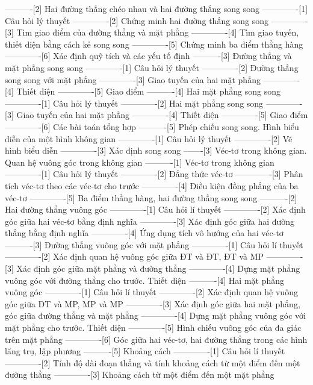 ----------[2] Hai đường thẳng chéo nhau và hai đường thẳng song song
-------------[1] Câu hỏi lý thuyết
-------------[2] Chứng minh hai đường thẳng song song
-------------[3] Tìm giao điểm của đường thẳng và mặt phẳng
-------------[4] Tìm giao tuyến, thiết diện bằng cách kẻ song song
-------------[5] Chứng minh ba điểm thẳng hàng
-------------[6] Xác định quỹ tích và các yếu tố định
----------[3] Đường thẳng và mặt phẳng song song
-------------[1] Câu hỏi lý thuyết
-------------[2] Đường thẳng song song với mặt phẳng
-------------[3] Giao tuyến của hai mặt phẳng
-------------[4] Thiết diện
-------------[5] Giao điểm
----------[4] Hai mặt phẳng song song
-------------[1] Câu hỏi lý thuyết
-------------[2] Hai mặt phẳng song song
-------------[3] Giao tuyến của hai mặt phẳng
-------------[4] Thiết diện
-------------[5] Giao điểm
-------------[6] Các bài toán tổng hợp
----------[5] Phép chiếu song song. Hình biểu diễn của một hình không gian
-------------[1] Câu hỏi lý thuyết
-------------[2] Vẽ hình biểu diễn
-------------[3] Xác định song song
-------[3] Véc-tơ trong không gian. Quan hệ vuông góc trong không gian
----------[1] Véc-tơ trong không gian
-------------[1] Câu hỏi lý thuyết
-------------[2] Đẳng thức véc-tơ
-------------[3] Phân tích véc-tơ theo các véc-tơ cho trước
-------------[4] Điều kiện đồng phẳng của ba véc-tơ
-------------[5] Ba điểm thẳng hàng, hai đường thẳng song song
----------[2] Hai đường thẳng vuông góc
-------------[1] Câu hỏi lí thuyết
-------------[2] Xác định góc giữa hai véc-tơ bằng định nghĩa
-------------[3] Xác định góc giữa hai đường thẳng bằng định nghĩa
-------------[4] Ứng dụng tích vô hướng của hai véc-tơ
----------[3] Đường thẳng vuông góc với mặt phẳng
-------------[1] Câu hỏi lí thuyết
-------------[2] Xác định quan hệ vuông góc giữa ĐT và ĐT, ĐT và MP
-------------[3] Xác định góc giữa mặt phẳng và đường thẳng
-------------[4] Dựng mặt phẳng vuông góc với đường thẳng cho trước. Thiết diện
----------[4] Hai mặt phẳng vuông góc
-------------[1] Câu hỏi lí thuyết
-------------[2] Xác định quan hệ vuông góc giữa ĐT và MP, MP và MP
-------------[3] Xác định góc giữa hai mặt phẳng, góc giữa đường thẳng và mặt phẳng
-------------[4] Dựng mặt phẳng vuông góc với mặt phẳng cho trước. Thiết diện
-------------[5] Hình chiếu vuông góc của đa giác trên mặt phẳng
-------------[6] Góc giữa hai véc-tơ, hai đường thẳng trong các hình lăng trụ, lập phương
----------[5] Khoảng cách
-------------[1] Câu hỏi lí thuyết
-------------[2] Tính độ dài đoạn thẳng và tính khoảng cách từ một điểm đến một đường thẳng
-------------[3] Khoảng cách từ một điểm đến một mặt phẳng
